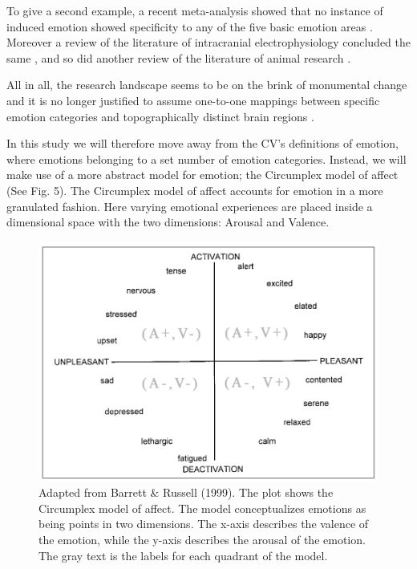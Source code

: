 \documentclass{article}
\begin{document}
To give a second example, a recent meta-analysis showed that no instance of induced emotion showed specificity to any of the five basic emotion areas \cite{lindquist2012brain}. Moreover a review of the literature of intracranial electrophysiology concluded the same \cite{guillory2014exploring},  and so did another review of the literature of animal research \cite{barrett2007mice}.
 
All in all, the research landscape seems to be on the brink of monumental change and it is no longer justified to assume one-to-one mappings between specific emotion categories and topographically distinct brain regions \cite{barrett2019historical}.
 
In this study we will therefore move away from the CV’s definitions of emotion, where emotions belonging to a set number of emotion categories. Instead, we will make use of a more abstract model for emotion; the Circumplex model of affect \cite{russell1980circumplex} (See Fig. 5). The Circumplex model of affect accounts for emotion in a more granulated fashion. Here varying emotional experiences are placed inside a dimensional space with the two dimensions: Arousal and Valence. 

\begin{figure}[H]
    \begin{centering}
    \includegraphics[width = \textwidth]{figures/circumplex.jpg}
    \caption{Adapted from Barrett \& Russell (1999). The plot shows the Circumplex model of affect. The model conceptualizes emotions as being points in two dimensions. The x-axis describes the valence of the emotion, while the y-axis describes the arousal of the emotion. The gray text is the labels for each quadrant of the model. }
    \end{centering}
\end{figure}
\end{document}
